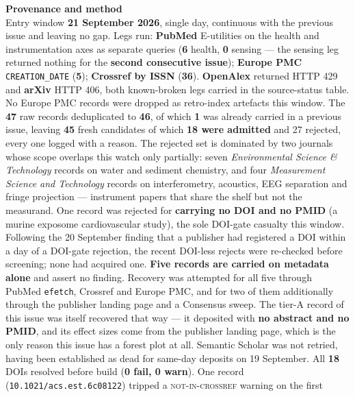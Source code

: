 \documentclass[10pt]{article}
\begin{document}


\vspace{4mm}
\begin{keybox}
{\sffamily\bfseries\footnotesize\color{Deep}Provenance and method}\\[1.2mm]
{\fontsize{7.2}{8.8}\selectfont
Entry window \textbf{21 September 2026}, single day, continuous with the previous issue and
leaving no gap. Legs run: \textbf{PubMed} E-utilities on the health and instrumentation
axes as separate queries (\textbf{6} health, \textbf{0} sensing --- the sensing leg returned
nothing for the \textbf{second consecutive issue}); \textbf{Europe PMC}
\texttt{CREATION\_DATE} (\textbf{5}); \textbf{Crossref by ISSN} (\textbf{36}).
\textbf{OpenAlex} returned HTTP 429 and \textbf{arXiv} HTTP 406, both known-broken legs
carried in the source-status table. No Europe PMC records were dropped as retro-index
artefacts this window. The \textbf{47} raw records deduplicated to \textbf{46}, of which
\textbf{1} was already carried in a previous issue, leaving \textbf{45} fresh candidates of
which \textbf{18 were admitted} and 27 rejected, every one logged with a reason. The
rejected set is dominated by two journals whose scope overlaps this watch only partially:
seven \textit{Environmental Science \& Technology} records on water and sediment chemistry,
and four \textit{Measurement Science and Technology} records on interferometry, acoustics,
EEG separation and fringe projection --- instrument papers that share the shelf but not the
measurand. One record was rejected for \textbf{carrying no DOI and no PMID} (a murine
exposome cardiovascular study), the sole DOI-gate casualty this window. Following the
20 September finding that a publisher had registered a DOI within a day of a
DOI-gate rejection, the recent DOI-less rejects were re-checked before screening; none had
acquired one.
\textbf{Five records are carried on metadata alone} and assert no finding. Recovery was
attempted for all five through PubMed \texttt{efetch}, Crossref and Europe PMC, and for two
of them additionally through the publisher landing page and a Consensus sweep. The tier-A
record of this issue was itself recovered that way --- it deposited with \textbf{no abstract
and no PMID}, and its effect sizes come from the publisher landing page, which is the only
reason this issue has a forest plot at all. Semantic Scholar was not retried, having been
established as dead for same-day deposits on 19 September. All \textbf{18} DOIs resolved
before build (\textbf{0 fail, 0 warn}). One record
(\texttt{10.1021/acs.est.6c08122}) tripped a \textsc{not-in-crossref} warning on the first
}
\end{keybox}
\end{document}
